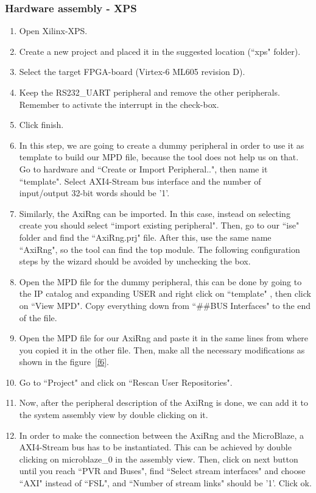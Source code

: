 \subsubsection{Hardware assembly - XPS}
\begin{enumerate}
\item Open Xilinx-XPS.
\item Create a new project and placed it in the suggested location (``xps" folder).
\item Select the target FPGA-board (Virtex-6 ML605 revision D).
\item Keep the RS232\_UART peripheral and remove the other peripherals. Remember to activate the interrupt in the check-box.
\item Click finish.
\item In this step, we are going to create a dummy peripheral in order to use it as template to build our MPD file, because the tool does not help us on that. Go to hardware and ``Create or Import Peripheral..", then name it ``template". Select AXI4-Stream bus interface and the number of input/output 32-bit words should be '1'.
\item Similarly, the AxiRng can be imported. In this case, instead on selecting create you should select ``import existing peripheral". Then, go to our ``ise" folder and find the ``AxiRng.prj" file. After this, use the same name ``AxiRng", so the tool can find the top module. The following configuration steps by the wizard should be avoided by unchecking the box.
\item Open the MPD file for the dummy peripheral, this can be done by going to the IP catalog and expanding USER and right click on ``template" , then click on ``View MPD". Copy everything down from ``\#\#BUS Interfaces" to the end of the file.
\item Open the MPD file for our AxiRng and paste it in the same lines from where you copied it in the other file. Then, make all the necessary modifications as shown in the figure~\ref{f6}.
\item Go to ``Project" and click on ``Rescan User Repositories". 
\item Now, after the peripheral description of the AxiRng is done, we can add it to the system assembly view by double clicking on it.
\item In order to make the connection between the AxiRng and the MicroBlaze, a AXI4-Stream bus has to be instantiated. This can be achieved by double clicking on microblaze\_0 in the assembly view. Then, click on next button until you reach ``PVR and Buses", find ``Select stream interfaces" and choose ``AXI" instead of ``FSL", and ``Number of stream links" should be '1'. Click ok.

\end{enumerate}
